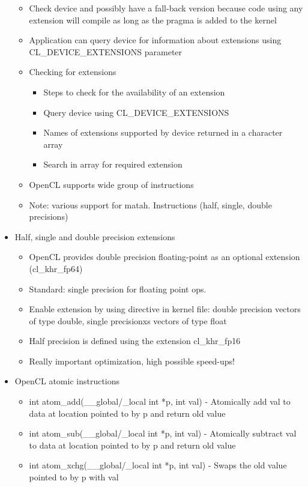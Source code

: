 \documentclass[paper=a4, fontsize=11pt]{scrartcl} %
\numberwithin{equation}{section} %
\numberwithin{figure}{section} %
\numberwithin{table}{section} %
\begin{document}
\begin{itemize}
\begin{itemize}
    \item Check device and possibly have a fall-back version because code using any extension will compile as long as the pragma is added to the kernel
    \item Application can query device for information about extensions using CL_DEVICE_EXTENSIONS parameter
    \item Checking for extensions
    \begin{itemize}
      \item Steps to check for the availability of an extension
      \item Query device using CL_DEVICE_EXTENSIONS
      \item Names of extensions supported by device returned in a character array
      \item Search in array for required extension
    \end{itemize}
    \item OpenCL supports wide group of instructions
    \item Note: various support for matah. Instructions (half, single, double precisions)
  \end{itemize}
  \item Half, single and double precision extensions
  \begin{itemize}
    \item OpenCL provides double precision floating-point as an optional extension (cl_khr_fp64)
    \item Standard: single precision for floating point ops.
    \item Enable extension by using directive in kernel file: double precision vectors of type double, single precisionxs vectors of type float
    \item Half precision is defined using the extension cl_khr_fp16
    \item Really important optimization, high possible speed-ups!
  \end{itemize}
  \item OpenCL atomic instructions
  \begin{itemize}
    \item int atom_add(__global/_local int *p, int val) - Atomically add val to data at location pointed to by p and return old value
    \item int atom_sub(__global/_local int *p, int val) - Atomically subtract val to data at location pointed to by p and return old value
    \item int atom_xchg(__global/_local int *p, int val) - Swaps the old value pointed to by p with val

\end{itemize}
\end{itemize}
\end{document}
